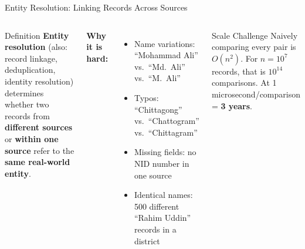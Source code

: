 \documentclass[aspectratio=169,10pt]{beamer}
\begin{document}
\begin{frame}{Entity Resolution: Linking Records Across Sources}
  \begin{columns}[T]
      \begin{block}{Definition}
        \textbf{Entity resolution} (also: record linkage, deduplication, identity resolution) determines whether two records from \textbf{different sources} or \textbf{within one source} refer to the \textbf{same real-world entity}.
      \end{block}
      \vspace{4pt}
      \textbf{Why it is hard:}
      \begin{itemize}
        \item Name variations: ``Mohammad Ali'' vs.\ ``Md.\ Ali'' vs.\ ``M.\ Ali''
        \item Typos: ``Chittagong'' vs.\ ``Chattogram'' vs.\ ``Chittagram''
        \item Missing fields: no NID number in one source
        \item Identical names: 500 different ``Rahim Uddin'' records in a district
      \end{itemize}
      \vspace{4pt}
      \begin{alertblock}{Scale Challenge}
        Naively comparing every pair is $O(n^2)$.  For $n = 10^7$ records, that is $10^{14}$ comparisons.  At 1 microsecond/comparison = \textbf{3 years}.
      \end{alertblock}


\end{columns}
\end{frame}
\end{document}
